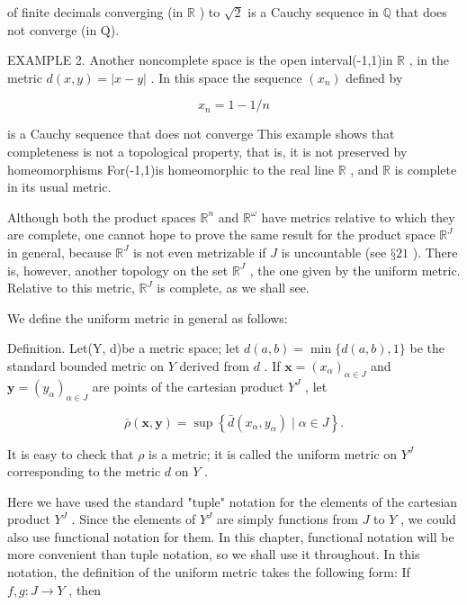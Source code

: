 of finite decimals converging (in \(\mathbb{R}\) ) to \(\sqrt{2}\) is a Cauchy sequence in \(\mathbb{Q}\) that does not converge (in Q).

EXAMPLE 2. Another noncomplete space is the open interval(-1,1)in \(\mathbb{R}\) , in the metric \(d\left( {x,y}\right)  = \left| {x - y}\right|\) . In this space the sequence \(\left( {x}_{n}\right)\) defined by

\[
{x}_{n} = 1 - 1/n
\]

is a Cauchy sequence that does not converge This example shows that completeness is not a topological property, that is, it is not preserved by homeomorphisms For(-1,1)is homeomorphic to the real line \(\mathbb{R}\) , and \(\mathbb{R}\) is complete in its usual metric.

Although both the product spaces \({\mathbb{R}}^{n}\) and \({\mathbb{R}}^{\omega }\) have metrics relative to which they are complete, one cannot hope to prove the same result for the product space \({\mathbb{R}}^{J}\) in general, because \({\mathbb{R}}^{J}\) is not even metrizable if \(J\) is uncountable (see \(§{21}\) ). There is, however, another topology on the set \({\mathbb{R}}^{J}\) , the one given by the uniform metric. Relative to this metric, \({\mathbb{R}}^{J}\) is complete, as we shall see.

We define the uniform metric in general as follows:

Definition. Let(Y, d)be a metric space; let \(d\left( {a,b}\right)  = \min \{ d\left( {a,b}\right) ,1\}\) be the standard bounded metric on \(Y\) derived from \(d\) . If \(\mathbf{x} = {\left( {x}_{\alpha }\right) }_{\alpha  \in  J}\) and \(\mathbf{y} = {\left( {y}_{\alpha }\right) }_{\alpha  \in  J}\) are points of the cartesian product \({Y}^{J}\) , let

\[
\bar{\rho }\left( {\mathbf{x},\mathbf{y}}\right)  = \sup \left\{  {\bar{d}\left( {{x}_{\alpha },{y}_{\alpha }}\right)  \mid  \alpha  \in  J}\right\}  .
\]

It is easy to check that \(\rho\) is a metric; it is called the uniform metric on \({Y}^{J}\) corresponding to the metric \(d\) on \(Y\) .

Here we have used the standard "tuple" notation for the elements of the cartesian product \({Y}^{J}\) . Since the elements of \({Y}^{J}\) are simply functions from \(J\) to \(Y\) , we could also use functional notation for them. In this chapter, functional notation will be more convenient than tuple notation, so we shall use it throughout. In this notation, the definition of the uniform metric takes the following form: If \(f,g : J \rightarrow  Y\) , then

